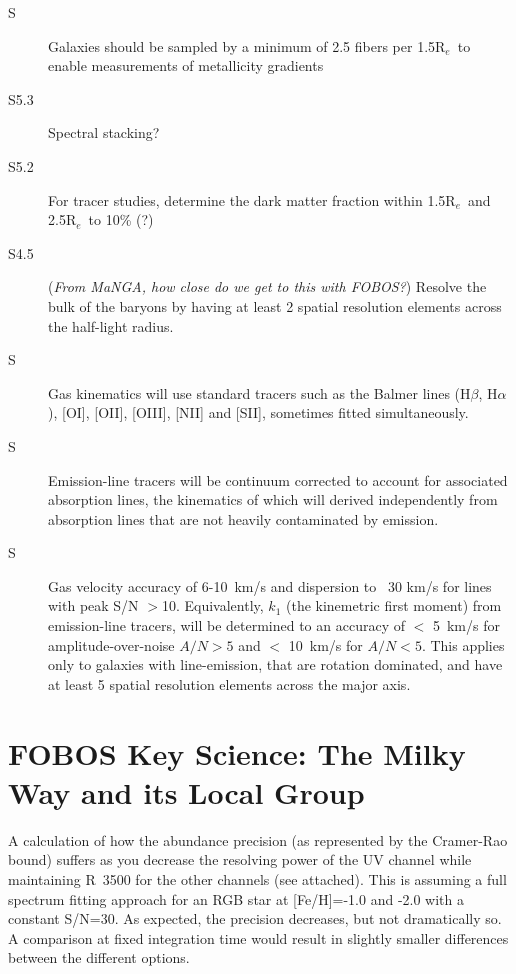 \documentclass[preprint,11pt]{aastex}
\newcommand{\Halpha}{{H$\alpha$}}
\newcommand{\Hbeta}{{H$\beta$}}
\newcommand{\Reff}{{R$_{e}$}}
\begin{document}
\begin{description}
\item[S] Galaxies should be sampled by a minimum of 2.5 fibers per 1.5\Reff\
 to enable measurements of metallicity gradients 

\item[S5.3] Spectral stacking?

\item[S5.2] For tracer studies, determine the dark matter fraction within 1.5\Reff\ and 2.5\Reff\ to 10\% (?)


\item [S4.5] (\emph{From MaNGA, how close do we get to this with FOBOS?}) Resolve the bulk of the baryons by having at least 2
  spatial resolution elements across the half-light radius.

\item[S]  Gas kinematics will use standard tracers such as the Balmer
  lines (\Hbeta, \Halpha), [OI], [OII], [OIII], [NII] and [SII],
  sometimes fitted simultaneously. 

\item[S]  Emission-line tracers will be continuum corrected to account for
  associated absorption lines, the kinematics of which will derived
  independently from absorption lines that are not heavily contaminated
  by emission.

\item[S] Gas velocity accuracy of 6-10~km/s and dispersion to
  ~30 km/s for lines with peak S/N $>$10.  Equivalently, $k_1$ (the
  kinemetric first moment) from emission-line tracers, will be
  determined to an accuracy of $<$ 5~km/s for amplitude-over-noise
  $A/N>5$ and $<$ 10~km/s for $A/N<5$. This applies only to galaxies
  with line-emission, that are rotation dominated, and have at least 5
  spatial resolution elements across the major axis.


\end{description}




\newpage
\section{FOBOS Key Science: The Milky Way and its Local Group} \label{sec:local}

A calculation of how the abundance precision (as represented by the Cramer-Rao bound) suffers as you decrease the resolving power of the UV channel while maintaining R~3500 for the other channels (see attached). This is assuming a full spectrum fitting approach for an RGB star at [Fe/H]=-1.0 and -2.0 with a constant S/N=30. As expected, the precision decreases, but not dramatically so. A comparison at fixed integration time would result in slightly smaller differences between the different options.
\end{document}
